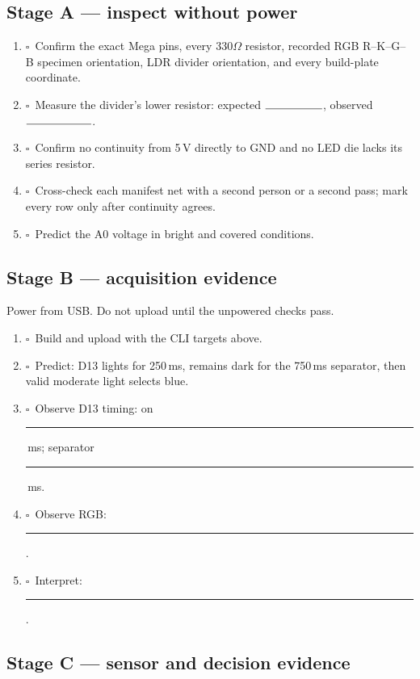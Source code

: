 \documentclass[11pt]{article}
\newcommand{\checkbox}{\(\square\)}
\newcommand{\blank}[1]{\rule{#1}{0.4pt}}
\begin{document}
\subsection{Stage A --- inspect without power}

\begin{enumerate}
  \item \checkbox\ Confirm the exact Mega pins, every 330\(\Omega\) resistor,
        recorded RGB R--K--G--B specimen orientation, LDR divider orientation,
        and every build-plate coordinate.
  \item \checkbox\ Measure the divider's lower resistor:
        expected \(\blank{.7in}\), observed \(\blank{.8in}\).
  \item \checkbox\ Confirm no continuity from 5\,V directly to GND and no LED
        die lacks its series resistor.
  \item \checkbox\ Cross-check each manifest net with a second person or a
        second pass; mark every row only after continuity agrees.
  \item \checkbox\ Predict the A0 voltage in bright and covered conditions.
\end{enumerate}

\subsection{Stage B --- acquisition evidence}

Power from USB. Do not upload until the unpowered checks pass.

\begin{enumerate}
  \item \checkbox\ Build and upload with the CLI targets above.
  \item \checkbox\ Predict: D13 lights for 250\,ms, remains dark for the
        750\,ms separator, then valid moderate light selects blue.
  \item \checkbox\ Observe D13 timing: on \blank{.6in}\,ms; separator
        \blank{.6in}\,ms.
  \item \checkbox\ Observe RGB: \blank{1.7in}.
  \item \checkbox\ Interpret: \blank{4.4in}.
\end{enumerate}

\subsection{Stage C --- sensor and decision evidence}
\end{document}
